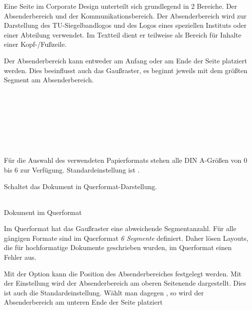Eine Seite im Corporate Design unterteilt sich grundlegend in 2 Bereiche.
Der Absenderbereich und der Kommunikationsbereich. Der Absenderbereich wird zur
Darstellung des TU-Siegelbandlogos und des Logos eines speziellen Instituts
oder einer Abteilung verwendet. Im Textteil dient er teilweise als Bereich für
Inhalte einer Kopf-/Fußzeile.

Der Absenderbereich kann entweder am Anfang oder am Ende der Seite platziert
werden. Dies beeinflusst auch das Gaußraster, es beginnt jeweils mit dem
größten Segment am Absenderbereich.

\begin{Declaration}
  \\
  \\
  \\
  \\
  \\
  \\
\end{Declaration}

Für die Auswahl des verwendeten Papierformats stehen alle DIN A-Größen von
0 bis 6 zur Verfügung. Standardeinstellung ist .

\begin{Declaration}
\end{Declaration}

Schaltet das Dokument in Querformat-Darstellung.

\begin{minipage}{0.45\textwidth}\sffamily\centering
  {}\\
  Dokument im Querformat
\end{minipage}


\begin{important}
  Im Querformat hat das Gaußraster eine abweichende
  Segmentanzahl. Für alle gängigen Formate sind im Querformat \emph{6 Segmente}
  definiert. Daher lösen Layouts, die für hochformatige Dokumente
  geschrieben wurden, im Querformat einen Fehler aus.
\end{important}


\begin{Declaration}
\end{Declaration}

Mit der Option  kann die Position des Absenderbereiches
festgelegt werden. Mit der Einstellung  wird
der Absenderbereich am oberen Seitenende dargestellt. Dies ist auch die
Standardeinstellung. Wählt man dagegen , so
wird der Absenderbereich am unteren Ende der Seite platziert


